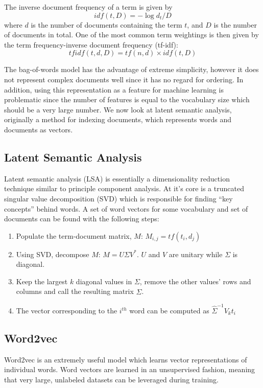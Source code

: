 The inverse document frequency of a term is given by
\begin{equation}
idf(t,D) = -\log d_t/D
\end{equation}
where $d$ is the number of documents containing the term $t$, and $D$ is the number of documents in total.  One of the most common term weightings is then given by the term frequency-inverse document frequency (tf-idf):
\begin{equation}
tfidf(t,d,D) = tf(n,d) \times idf(t,D)
\end{equation}

The bag-of-words model has the advantage of extreme simplicity, however it does not represent complex documents well since it has no regard for ordering.  In addition, using this representation as a feature for machine learning is problematic since the number of features is equal to the vocabulary size which should be a very large number.  We now look at latent semantic analysis, originally a method for indexing documents, which represents words and documents as vectors.

\subsection{Latent Semantic Analysis}
Latent semantic analysis (LSA) is essentially a dimensionality reduction technique similar to principle component analysis.  At it's core is a truncated singular value decomposition (SVD) which is responsible for finding ``key concepts'' behind words.  A set of word vectors for some vocabulary and set of documents can be found with the following steps:

\begin{enumerate}
\item Populate the term-document matrix, $M$: $M_{i,j} = tf(t_i,d_j)$
\item Using SVD, decompose $M$: $M = U\Sigma V^*$.  $U$ and $V$ are unitary while $\Sigma$ is diagonal.
\item Keep the largest $k$ diagonal values in $\Sigma$, remove the other values' rows and columns and call the resulting matrix $\hat{\Sigma}$.
\item The vector corresponding to the $i^{th}$ word can be computed as $\hat{\Sigma}^{-1}V_k t_i$
\end{enumerate}

\subsection{Word2vec}
Word2vec is an extremely useful model which learns vector representations of individual words.  Word vectors are learned in an unsupervised fashion, meaning that very large, unlabeled datasets can be leveraged during training.  


